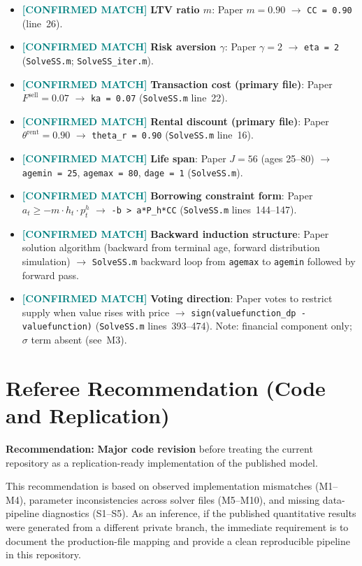 \documentclass[11pt]{article}
\newcommand{\confirmed}{\textcolor{teal}{\textbf{[CONFIRMED MATCH]}}}
\begin{document}
\begin{itemize}
  \item \confirmed{} \textbf{LTV ratio $m$}: Paper $m = 0.90$ $\to$ \texttt{CC = 0.90} (line~26).
  \item \confirmed{} \textbf{Risk aversion $\gamma$}: Paper $\gamma = 2$ $\to$ \texttt{eta = 2}
    (\texttt{SolveSS.m}; \texttt{SolveSS\_iter.m}).
  \item \confirmed{} \textbf{Transaction cost (primary file)}: Paper $F^{\mathrm{sell}} = 0.07$
    $\to$ \texttt{ka = 0.07} (\texttt{SolveSS.m} line~22).
  \item \confirmed{} \textbf{Rental discount (primary file)}: Paper $\theta^{\mathrm{rent}} = 0.90$
    $\to$ \texttt{theta\_r = 0.90} (\texttt{SolveSS.m} line~16).
  \item \confirmed{} \textbf{Life span}: Paper $J = 56$ (ages 25--80) $\to$
    \texttt{agemin = 25}, \texttt{agemax = 80}, \texttt{dage = 1} (\texttt{SolveSS.m}).
  \item \confirmed{} \textbf{Borrowing constraint form}: Paper $a_t \geq -m \cdot h_t \cdot p_t^h$
    $\to$ \texttt{-b > a*P\_h*CC} (\texttt{SolveSS.m} lines~144--147).
  \item \confirmed{} \textbf{Backward induction structure}: Paper solution algorithm
    (backward from terminal age, forward distribution simulation) $\to$
    \texttt{SolveSS.m} backward loop from \texttt{agemax} to \texttt{agemin} followed
    by forward pass.
  \item \confirmed{} \textbf{Voting direction}: Paper votes to restrict supply when
    value rises with price $\to$ \texttt{sign(valuefunction\_dp - valuefunction)}
    (\texttt{SolveSS.m} lines~393--474). Note: financial component only; $\sigma$ term absent (see~M3).
\end{itemize}

\section*{Referee Recommendation (Code and Replication)}

\noindent\textbf{Recommendation:} \textbf{Major code revision} before treating the
current repository as a replication-ready implementation of the published model.

\medskip
\noindent This recommendation is based on observed implementation mismatches
(M1--M4), parameter inconsistencies across solver files (M5--M10), and missing
data-pipeline diagnostics (S1--S5). As an inference, if the published quantitative
results were generated from a different private branch, the immediate requirement is
to document the production-file mapping and provide a clean reproducible pipeline in
this repository.
\end{document}
